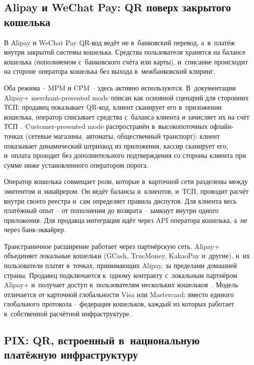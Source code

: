 \subsection*{Alipay и WeChat Pay: QR поверх закрытого
кошелька}\label{sec:alt-qr-wallet}

В Alipay и WeChat Pay QR-код ведёт не в~банковский перевод,
а~в~платёж внутри закрытой системы кошелька. Средства пользователя
хранятся на балансе кошелька (пополняемом с~банковского счёта или
карты), и~списание происходит на стороне оператора кошелька без
выхода в~межбанковский клиринг.

Оба режима -- MPM и CPM -- здесь активно используются.
В~документации Alipay+ merchant-presented mode описан как основной
сценарий для сторонних ТСП: продавец показывает QR-код,
клиент сканирует его в~приложении кошелька, оператор списывает
средства с~баланса клиента и зачисляет их на счёт
ТСП~\cite{alipayplus-mpm}. Customer-presented mode распространён
в~высокопоточных офлайн-точках (сетевые магазины, автоматы,
общественный транспорт): клиент показывает динамический штрихкод
из приложения, кассир сканирует его, и~оплата проходит без
дополнительного подтверждения со стороны клиента при сумме ниже
установленного оператором порога.

Оператор кошелька совмещает роли, которые в~карточной сети
разделены между эмитентом и эквайрером. Он ведёт балансы и~клиентов,
и~ТСП, проводит расчёт внутри своего реестра и~сам определяет
правила диспутов. Для клиента весь платёжный опыт -- от пополнения
до возврата -- замкнут внутри одного приложения. Для продавца
интеграция идёт через API оператора кошелька, а~не через банк-эквайрер.

Трансграничное расширение работает через партнёрскую сеть. Alipay+
объединяет локальные кошельки (GCash, TrueMoney, KakaoPay и~другие),
и~их пользователи платят в~точках, принимающих Alipay, за
пределами домашней страны. Продавец подключается к~одному контракту
с~локальным партнёром Alipay+ и~получает доступ к~пользователям
нескольких кошельков~\cite{alipayplus-mpm}. Модель отличается
от карточной глобальности Visa или Mastercard: вместо единого
глобального протокола -- федерация кошельков, каждый из которых
работает в~собственной расчётной инфраструктуре.

\subsection*{PIX: QR, встроенный в~национальную платёжную
инфраструктуру}\label{sec:alt-qr-pix}

